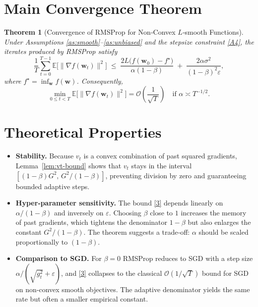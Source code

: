 \documentclass{article}
\newtheorem{theorem}{Theorem}
\newcommand{\E}{\mathbb{E}}
\begin{document}
\section*{Main Convergence Theorem}
\begin{theorem}[Convergence of RMSProp for Non‑Convex $L$‑smooth Functions]\label{thm:main}
Under Assumptions \ref{as:smooth}–\ref{as:unbiased} and the stepsize constraint
\eqref{A4}, the iterates produced by RMSProp satisfy
\[
\frac{1}{T}\sum_{t=0}^{T-1}\E\big[\|\nabla f(\bm w_{t})\|^{2}\big]\;
\le\;
\frac{2L\big(f(\bm w_{0})-f^{\star}\big)}{\alpha(1-\beta)}
\;+\;
\frac{2\alpha\sigma^{2}}{(1-\beta)^{2}\varepsilon},
\tag{3}
\]
where $f^{\star}=\inf_{\bm w}f(\bm w)$. Consequently,
\[
\min_{0\le t<T}\E\big[\|\nabla f(\bm w_{t})\|^{2}\big]=\mathcal O\!\left(\frac{1}{\sqrt{T}}\right)
\quad\text{if }\alpha\asymp T^{-1/2}.
\]
\end{theorem}

\section*{Theoretical Properties}
\begin{itemize}
\item \textbf{Stability.}  Because $v_{t}$ is a convex combination of past squared
gradients, Lemma~\ref{lem:vt-bound} shows that $v_{t}$ stays in the interval
$[(1-\beta)G^{2},\,G^{2}/(1-\beta)]$, preventing division by zero and guaranteeing
bounded adaptive steps.
\item \textbf{Hyper‑parameter sensitivity.}
The bound \eqref{3} depends linearly on $\alpha/(1-\beta)$ and inversely on
$\varepsilon$. Choosing $\beta$ close to $1$ increases the memory of past
gradients, which tightens the denominator $1-\beta$ but also enlarges the
constant $G^{2}/(1-\beta)$. The theorem suggests a trade‑off: $\alpha$ should be
scaled proportionally to $(1-\beta)$.
\item \textbf{Comparison to SGD.}
For $\beta=0$ RMSProp reduces to SGD with a step size $\alpha/(\sqrt{g_{t}^{2}}+\varepsilon)$,
and \eqref{3} collapses to the classical $\mathcal O(1/\sqrt{T})$ bound for SGD on
non‑convex smooth objectives. The adaptive denominator yields the same rate
but often a smaller empirical constant.
\end{itemize}

\end{document}
